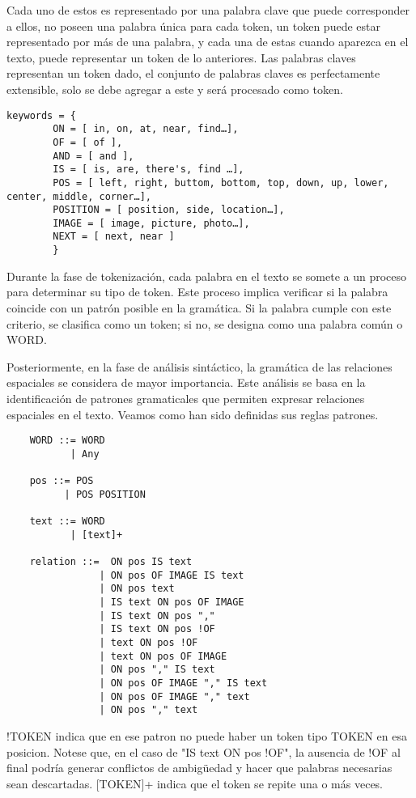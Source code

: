 Cada uno de estos es representado por una palabra clave que puede corresponder a ellos, no poseen una palabra única para cada token, un token puede estar representado por más de una palabra, y cada una de estas cuando aparezca en el texto, puede representar un token de lo anteriores. Las palabras claves representan un token dado, el conjunto de palabras claves es perfectamente extensible, solo se debe agregar a este y será procesado como token.

\begin{lstlisting}
keywords = {
        ON = [ in, on, at, near, find…],
        OF = [ of ],
        AND = [ and ],
        IS = [ is, are, there's, find …],
        POS = [ left, right, buttom, bottom, top, down, up, lower, center, middle, corner…],
        POSITION = [ position, side, location…],
        IMAGE = [ image, picture, photo…],
        NEXT = [ next, near ]
        }
\end{lstlisting}

Durante la fase de tokenización, cada palabra en el texto se somete a un proceso para determinar su tipo de token. Este proceso implica verificar si la palabra coincide con un patrón posible en la gramática. Si la palabra cumple con este criterio, se clasifica como un token; si no, se designa como una palabra común o WORD.

Posteriormente, en la fase de análisis sintáctico, la gramática de las relaciones espaciales se considera de mayor importancia. Este análisis se basa en la identificación de patrones gramaticales que permiten expresar relaciones espaciales en el texto. Veamos como han sido definidas sus reglas patrones.
 
\begin{lstlisting}
    WORD ::= WORD
           | Any
    
    pos ::= POS
          | POS POSITION 

    text ::= WORD
           | [text]+
        
    relation ::=  ON pos IS text
                | ON pos OF IMAGE IS text
                | ON pos text
                | IS text ON pos OF IMAGE
                | IS text ON pos ","
                | IS text ON pos !OF
                | text ON pos !OF
                | text ON pos OF IMAGE
                | ON pos "," IS text
                | ON pos OF IMAGE "," IS text
                | ON pos OF IMAGE "," text
                | ON pos "," text
\end{lstlisting}

!TOKEN indica que en ese patron no puede haber un token tipo TOKEN en esa posicion. Notese que, en el caso de "IS text ON pos !OF", la ausencia de !OF al final podría generar conflictos de ambigüedad y hacer que palabras necesarias sean descartadas. [TOKEN]+ indica que el token se repite una o m\'as veces.

